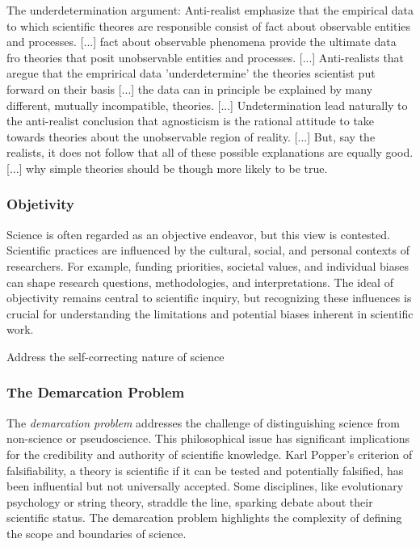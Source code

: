 {\color{red}

The underdetermination argument: Anti-realist emphasize that the empirical data to which scientific theores are responsible consist of fact about observable entities and processes. [...] fact about observable phenomena provide the ultimate data fro theories that posit unobservable entities and processes. [...] Anti-realists that aregue that the emprirical data 'underdetermine' the theories scientist put forward on their basis [...] the data can in principle be explained by many different, mutually incompatible, theories. [...] Undetermination lead naturally to the anti-realist conclusion that agnosticism is the rational attitude to take towards theories about the unobservable region of reality. [...] But, say the realists, it does not follow that all of these possible explanations are equally good. [...] why simple theories should be though more likely to be true.

}

\subsubsection*{Objetivity}

Science is often regarded as an objective endeavor, but this view is contested. Scientific practices are influenced by the cultural, social, and personal contexts of researchers. For example, funding priorities, societal values, and individual biases can shape research questions, methodologies, and interpretations. The ideal of objectivity remains central to scientific inquiry, but recognizing these influences is crucial for understanding the limitations and potential biases inherent in scientific work.

{\color{red} Address the self-correcting nature of science}

\subsubsection{The Demarcation Problem}

The \emph{demarcation problem} addresses the challenge of distinguishing science from non-science or pseudoscience. This philosophical issue has significant implications for the credibility and authority of scientific knowledge. Karl Popper's criterion of falsifiability, a theory is scientific if it can be tested and potentially falsified, has been influential but not universally accepted. Some disciplines, like evolutionary psychology or string theory, straddle the line, sparking debate about their scientific status. The demarcation problem highlights the complexity of defining the scope and boundaries of science.

